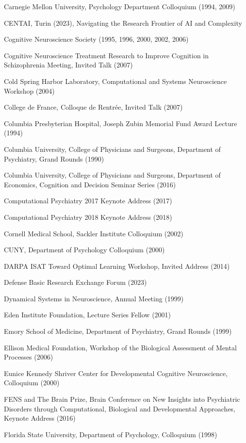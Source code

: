 \documentclass[10 pt]{article}
\begin{document}
Carnegie Mellon University, Psychology Department Colloquium (1994, 2009)

CENTAI, Turin (2023), Navigating the Research Frontier of AI and Complexity

Cognitive Neuroscience Society (1995, 1996, 2000, 2002, 2006)

Cognitive Neuroscience Treatment Research to Improve Cognition in Schizophrenia Meeting, Invited Talk (2007)

Cold Spring Harbor Laboratory, Computational and Systems Neuroscience Workshop (2004)

College de France, Colloque de Rentrée, Invited Talk (2007)

Columbia Presbyterian Hospital, Joseph Zubin Memorial Fund Award Lecture (1994)

Columbia University, College of Physicians and Surgeons,
Department of Psychiatry, Grand Rounds (1990)

Columbia University, College of Physicians and Surgeons,
Department of Economics, Cognition and Decision Seminar Series (2016)

Computational Psychiatry 2017 Keynote Address (2017)

Computational Psychiatry 2018 Keynote Address (2018)

Cornell Medical School, Sackler Institute Colloquium (2002)

CUNY, Department of Psychology Colloquium (2000)

DARPA ISAT Toward Optimal Learning Workshop, Invited Address (2014)

Defense Basic Research Exchange Forum (2023)

Dynamical Systems in Neuroscience, Annual Meeting (1999)

Eden Institute Foundation, Lecture Series Fellow (2001)

Emory School of Medicine, Department of Psychiatry, Grand Rounds (1999)

Ellison Medical Foundation, Workshop of the Biological Assessment of Mental Processes (2006)

Eunice Kennedy Shriver Center for Developmental Cognitive Neuroscience, Colloquium (2000)

FENS and The Brain Prize, Brain Conference on New Insights into Psychiatric Disorders through Computational, Biological and Developmental Approaches, Keynote Address (2016)

Florida State University, Department of Psychology, Colloquium (1998)
\end{document}
